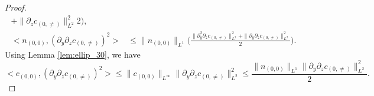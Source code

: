 \documentclass[10pt,a4paper]{amsart}
\begin{document}
\begin{proof}
\begin{equation}
\begin{aligned}
{					+\|\partial_zc_{(0,\neq)}\|^2_{L^2}}{2}\Big),\\
				<n_{(0,0)},(\partial_y\partial_zc_{(0,\neq)})^2>
				&\leq \|n_{(0,0)}\|_{L^1}
				\Big(\frac{\|\partial_y^2\partial_zc_{(0,\neq)}\|_{L^2}^2
					+\|\partial_y\partial_zc_{(0,\neq)}\|^2_{L^2}}{2}\Big).
			\end{aligned}
		\end{equation}
		Using Lemma \ref{lem:ellip_30}, we have 
		\begin{equation}\label{cn_temp02}
			<c_{(0,0)},(\partial_y\partial_zc_{(0,\neq)})^2>
			\leq 	\|c_{(0,0)}\|_{L^{\infty}}
			\|\partial_y\partial_zc_{(0,\neq)}\|_{L^2}^2
			\leq \frac{\|n_{(0,0)}\|_{L^1}
				\|\partial_y\partial_zc_{(0,\neq)}\|_{L^2}^2}{2}.
		\end{equation}

\end{proof}
\end{document}
